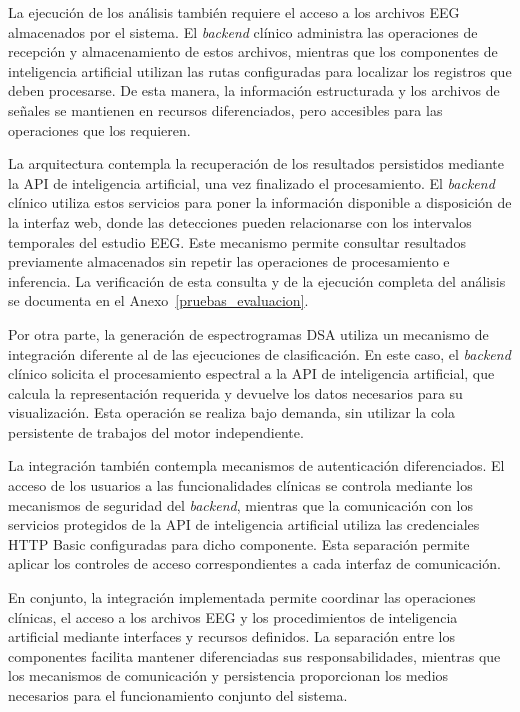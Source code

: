 La ejecución de los análisis también requiere el acceso
a los archivos EEG almacenados por el sistema. El \textit{backend}
clínico administra las operaciones de recepción y
almacenamiento de estos archivos, mientras que los
componentes de inteligencia artificial utilizan las
rutas configuradas para localizar los registros que
deben procesarse. De esta manera, la información
estructurada y los archivos de señales se mantienen
en recursos diferenciados, pero accesibles para las
operaciones que los requieren.


La arquitectura contempla la recuperación de los resultados persistidos mediante la API de inteligencia artificial, una vez finalizado el procesamiento. El \textit{backend} clínico utiliza estos servicios para poner la información disponible a disposición de la interfaz web, donde las detecciones pueden relacionarse con los intervalos temporales del estudio EEG. Este mecanismo permite consultar resultados previamente almacenados sin repetir las operaciones de procesamiento e inferencia. La verificación de esta consulta y de la ejecución completa del análisis se documenta en el Anexo~\ref{pruebas_evaluacion}.


Por otra parte, la generación de espectrogramas DSA
utiliza un mecanismo de integración diferente al de
las ejecuciones de clasificación. En este caso, el
\textit{backend} clínico solicita el procesamiento espectral
a la API de inteligencia artificial, que calcula
la representación requerida y devuelve los datos
necesarios para su visualización. Esta operación
se realiza bajo demanda, sin utilizar la cola
persistente de trabajos del motor independiente.

La integración también contempla mecanismos de
autenticación diferenciados. El acceso de los usuarios
a las funcionalidades clínicas se controla mediante
los mecanismos de seguridad del \textit{backend}, mientras
que la comunicación con los servicios protegidos
de la API de inteligencia artificial utiliza las
credenciales HTTP Basic configuradas para dicho
componente. Esta separación permite aplicar los
controles de acceso correspondientes a cada interfaz
de comunicación.

En conjunto, la integración implementada permite
coordinar las operaciones clínicas, el acceso a los
archivos EEG y los procedimientos de inteligencia
artificial mediante interfaces y recursos definidos.
La separación entre los componentes facilita mantener
diferenciadas sus responsabilidades, mientras que
los mecanismos de comunicación y persistencia
proporcionan los medios necesarios para el
funcionamiento conjunto del sistema.



